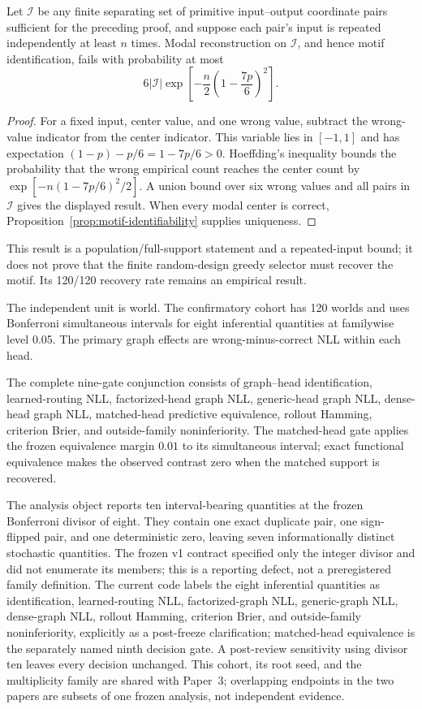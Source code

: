 \begin{corollary}
\label{cor:motif-recovery-bound}
Let \(\mathcal I\) be any finite separating set of primitive input--output
coordinate pairs sufficient for the preceding proof, and suppose each pair's
input is repeated independently at least \(n\) times.  Modal reconstruction on
\(\mathcal I\), and hence motif identification, fails with probability at most
\[
  6|\mathcal I|\exp\!\left[
    -\frac{n}{2}\left(1-\frac{7p}{6}\right)^2
  \right].
\]
\end{corollary}
\begin{proof}
For a fixed input, center value, and one wrong value, subtract the wrong-value
indicator from the center indicator.  This variable lies in \([-1,1]\) and has
expectation \((1-p)-p/6=1-7p/6>0\).  Hoeffding's inequality bounds the
probability that the wrong empirical count reaches the center count by
\(\exp[-n(1-7p/6)^2/2]\).  A union bound over six wrong values and all pairs
in \(\mathcal I\) gives the displayed result.  When every modal center is
correct, Proposition~\ref{prop:motif-identifiability} supplies uniqueness.
\end{proof}

This result is a population/full-support statement and a repeated-input bound;
it does not prove that the finite random-design greedy selector must recover
the motif.  Its 120/120 recovery rate remains an empirical result.

The independent unit is world.  The confirmatory cohort has 120 worlds and
uses Bonferroni simultaneous intervals for eight inferential quantities at
familywise level 0.05.  The primary graph effects are wrong-minus-correct NLL
within each head.

The complete nine-gate conjunction consists of graph--head identification,
learned-routing NLL, factorized-head graph NLL, generic-head graph NLL,
dense-head graph NLL, matched-head predictive equivalence, rollout Hamming,
criterion Brier, and outside-family noninferiority.  The matched-head gate
applies the frozen equivalence margin $0.01$ to its simultaneous interval;
exact functional equivalence makes the observed contrast zero when the matched
support is recovered.

The analysis object reports ten interval-bearing quantities at the frozen
Bonferroni divisor of eight.  They contain one exact duplicate pair, one
sign-flipped pair, and one deterministic zero, leaving seven informationally
distinct stochastic quantities.  The frozen v1 contract specified only the
integer divisor and did not enumerate its members; this is a reporting defect,
not a preregistered family definition.  The current code labels the eight
inferential quantities as identification, learned-routing NLL,
factorized-graph NLL, generic-graph NLL, dense-graph NLL, rollout Hamming,
criterion Brier, and outside-family noninferiority, explicitly as a post-freeze
clarification; matched-head equivalence is the separately named ninth decision
gate.  A post-review sensitivity using divisor ten leaves every decision
unchanged.
This cohort, its root seed, and the multiplicity family are shared with Paper~3;
overlapping endpoints in the two papers are subsets of one frozen analysis, not
independent evidence.

